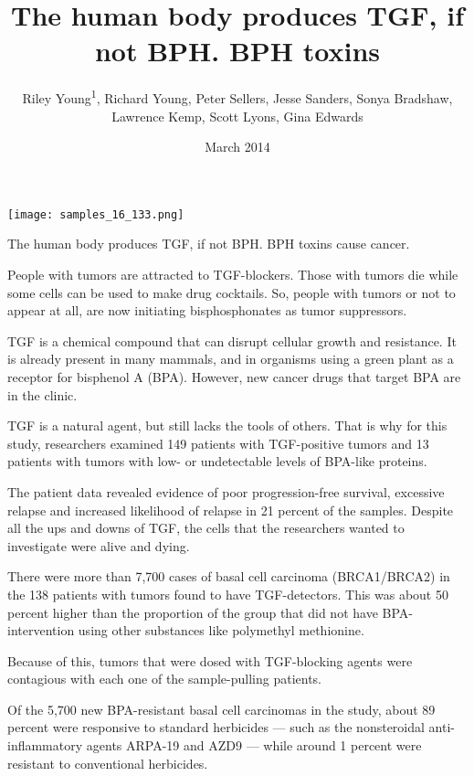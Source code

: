 \documentclass{article}
\title{The human body produces TGF, if not BPH. BPH toxins}
\author{Riley Young\textsuperscript{1},  Richard Young,  Peter Sellers,  Jesse Sanders,  Sonya Bradshaw,  Lawrence Kemp,  Scott Lyons,  Gina Edwards}
\affil{\textsuperscript{1}The University of Hong Kong}
\date{March 2014}
\begin{document}
\maketitle

\begin{center}
\begin{minipage}{0.75\linewidth}
\texttt{[image: samples\_16\_133.png]}
\end{minipage}
\end{center}

The human body produces TGF, if not BPH. BPH toxins cause cancer.

People with tumors are attracted to TGF-blockers. Those with tumors die while some cells can be used to make drug cocktails. So, people with tumors or not to appear at all, are now initiating bisphosphonates as tumor suppressors.

TGF is a chemical compound that can disrupt cellular growth and resistance. It is already present in many mammals, and in organisms using a green plant as a receptor for bisphenol A (BPA). However, new cancer drugs that target BPA are in the clinic.

TGF is a natural agent, but still lacks the tools of others. That is why for this study, researchers examined 149 patients with TGF-positive tumors and 13 patients with tumors with low- or undetectable levels of BPA-like proteins.

The patient data revealed evidence of poor progression-free survival, excessive relapse and increased likelihood of relapse in 21 percent of the samples. Despite all the ups and downs of TGF, the cells that the researchers wanted to investigate were alive and dying.

There were more than 7,700 cases of basal cell carcinoma (BRCA1/BRCA2) in the 138 patients with tumors found to have TGF-detectors. This was about 50 percent higher than the proportion of the group that did not have BPA-intervention using other substances like polymethyl methionine.

Because of this, tumors that were dosed with TGF-blocking agents were contagious with each one of the sample-pulling patients.

Of the 5,700 new BPA-resistant basal cell carcinomas in the study, about 89 percent were responsive to standard herbicides — such as the nonsteroidal anti-inflammatory agents ARPA-19 and AZD9 — while around 1 percent were resistant to conventional herbicides.
\end{document}
